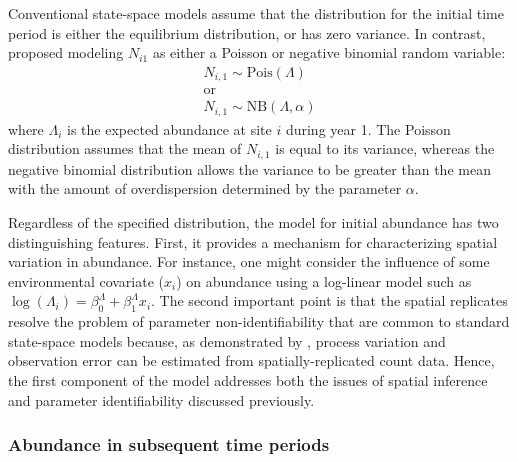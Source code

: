 \documentclass[12pt]{article}
\begin{document}
Conventional state-space models assume that the
distribution for the initial time period %
is either the equilibrium
distribution, or has zero variance.
In contrast, \citet{dail_madsen:2011} proposed modeling $N_{i1}$
as either a Poisson or negative binomial random variable:
\begin{gather}
N_{i,1} \sim \mathrm{Pois}(\Lambda) \nonumber \\
\text{or} \nonumber \\
N_{i,1} \sim \mathrm{NB}(\Lambda, \alpha)
\label{eq:N1}
\end{gather}
where $\Lambda_i$ is the expected abundance at site $i$ during
year 1.
The Poisson distribution assumes that the mean of $N_{i,1}$ is
equal to its variance, whereas the negative binomial distribution allows the
variance to be greater than the mean with the amount of
overdispersion determined by the parameter $\alpha$.

Regardless of the specified distribution, the model for initial
abundance has two distinguishing features. First, it provides a
mechanism for characterizing spatial variation in abundance. For
instance, one might consider the influence of some environmental
covariate ($x_i$) on abundance using a log-linear
model such as $\log(\Lambda_i) = \beta^{\Lambda}_0 +
\beta^{\Lambda}_1
x_{i}$. The second important point is that the spatial
replicates resolve the
problem of parameter non-identifiability that are common to
standard state-space models because, as demonstrated by
\citet{royle:2004biom},
process variation and observation error can be estimated from
spatially-replicated count data. Hence, the first component of
the model addresses both the issues of spatial inference and
parameter identifiability discussed previously.

\subsubsection{Abundance in subsequent time periods}
\end{document}
